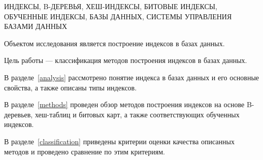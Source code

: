 \begin{essay}{}
    \noindent\mbox{ИНДЕКСЫ,} \mbox{B-ДЕРЕВЬЯ,} \mbox{ХЕШ-ИНДЕКСЫ,}
    \mbox{БИТОВЫЕ} \mbox{ИНДЕКСЫ,} \mbox{ОБУЧЕННЫЕ} \mbox{ИНДЕКСЫ,} \mbox{БАЗЫ}
    \mbox{ДАННЫХ,} \mbox{СИСТЕМЫ} \mbox{УПРАВЛЕНИЯ} \mbox{БАЗАМИ} \mbox{ДАННЫХ}

    Объектом исследования является построение индексов в базах данных.

    Цель работы --- классификация методов построения индексов в базах данных.

    В разделе~\ref{analysis} рассмотрено понятие индекса в базах данных и его
    основные свойства, а также описаны типы индексов.

    В разделе~\ref{methods} проведен обзор методов построения индексов на основе
    B-деревьев, хеш-таблиц и битовых карт, а также соответствующих обученных
    индексов.

    В разделе~\ref{classification} приведены критерии оценки качества описанных
    методов и проведено сравнение по этим критериям.


\end{essay}
